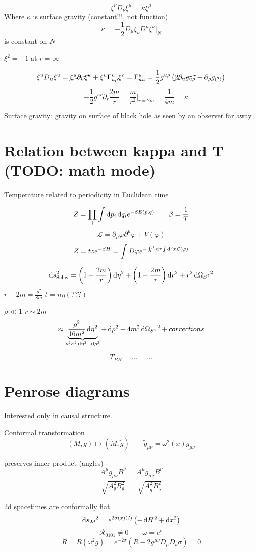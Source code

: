 \[ \xi^\nu D_\nu \xi^\mu = \kappa \xi^\mu \]
Where $\kappa$ is surface gravity (constant!!!, not function)
\[ \kappa = - \frac{1}{2}D_\mu \xi_\nu D^\mu \xi^\nu |_N \]
is constant on $N$

$\xi^2 = -1$ at $r = \infty$

\[ \xi^u D_u \xi^u = \cancel{\xi^u\partial_u\xi^u} + \xi^u \Gamma^u_{u\rho}\xi^\rho = \Gamma^u_{uu} = \frac{1}{2} g^{u\rho} \left(\cancel{2\partial_ug_{u\rho}} - \partial_\rho g_{(?)} \right) \]
\[ = - \frac{1}{2}g^{ur}\partial_r \frac{2m}{r} = \frac{m}{r^2}|_{r=2m} = \boxed{\frac{1}{4m}= \kappa} \]

Surface gravity: gravity on surface of black hole as seen by an observer far away


\section{Relation between kappa and T (TODO: math mode)}

Temperature related to periodicity in Euclidean time

\[ Z = \prod_i \int \operatorname{d \!}{p_i}\operatorname{d \!}{q_i} e^{-\beta E(p,q)} \qquad \beta = \frac{1}{T} \]
\[ \mathcal{L} = \partial_\mu\varphi\partial^\mu\varphi + V(\varphi) \]
\[ Z = tz e^{-\beta H} = \int D\varphi e^{-\int_0^\beta \operatorname{d \!}{\tau}\int \operatorname{d \!}{^3x}\mathcal{L}(\varphi)} \]

\[ \operatorname{d \!}{s}^2_\text{Schw} = \left(1 - \frac{2m}{r}\right)\operatorname{d \!}{\eta}^2 + \left(1- \frac{2m}{r}\right)\operatorname{d \!}{r}^2 + r^2 \operatorname{d \!}{\Omega_{S^2}}^2 \]
$r - 2m = \frac{\rho^2}{8m}$ $t = n\eta (???)$

$\rho \ll 1$ $r \sim 2m$
\[ \approx \underbrace{\frac{\rho^2}{16m^2}\operatorname{d \!}{\eta}^2}_{\rho^2\kappa^2 \operatorname{d \!}{\eta}^2 + \operatorname{d \!}{\rho}^2} + \operatorname{d \!}{\rho}^2 + 4m^2 \operatorname{d \!}{\Omega_{S^2}}^2 + corrections \] 

\[T_{BH}  = ... = ...\]

\section{Penrose diagrams}
Interested only in causal structure. 


Conformal transformation
\[ (M,g) \mapsto (\tilde{M}, \tilde{g}) \qquad \tilde{g}_{\mu\nu} = \omega^2(x)g_{\mu\nu} \]

preserves inner product (angles)
\[ \frac{A^\mu g_{\mu\nu} B^\nu}{\sqrt{A^2_g B^2_g}} = \frac{A^\mu \tilde{g}_{\mu\nu} B^\nu}{\sqrt{A^2_{\tilde{g}} B^2_{\tilde{g}}}} \]

2d spacetimes are conformally flat
\[ \operatorname{d \!}{s_{2d}}^2 = e^{2\sigma(x)(?)}\left(- \operatorname{d \!}{H}^2 + \operatorname{d \!}{x}^2\right) \]
\[ \mathcal{R}_{0101} \neq 0 \qquad \omega = e^\sigma \]
\[ \tilde{R} = R(\omega^2 g) = e^{-2\sigma} \left(R - 2g^{\mu\nu} D_\mu D_\nu \sigma\right) = 0 \]

